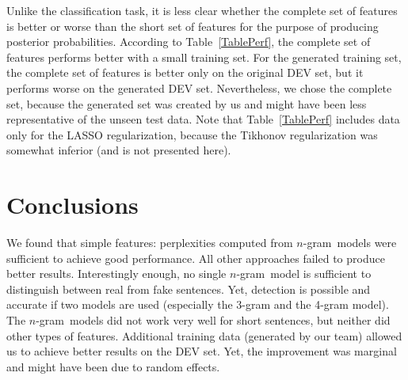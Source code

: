 \documentclass[11pt]{article}
\newcommand{\ngram}{\mbox{$n$-gram }}
\begin{document}
Unlike the classification task, it is less clear whether the complete set of features is better or worse
than the short set of features for the purpose of producing posterior probabilities.
According to Table~\ref{TablePerf}, the complete set of features performs better with a small training set.
For the generated training set, the complete set of features is better only on the original DEV set,
but it performs worse on the generated DEV set.
Nevertheless, we chose the complete set,
because the generated set was created by us and might have been less representative of the unseen test data.
Note that Table~\ref{TablePerf} includes data only for the LASSO
regularization, because the Tikhonov regularization was somewhat inferior (and is not presented here).

\section{Conclusions}
We found that simple features: perplexities computed from \ngram models were sufficient to achieve good performance.
All other approaches failed to produce better results.
Interestingly enough, no single \ngram model is sufficient to distinguish between real from fake sentences.
Yet, detection is possible and accurate if two models are used (especially the 3-gram and the 4-gram model). 
The \ngram models did not work very well for short sentences, but neither did other types of features.
Additional training data (generated by our team) allowed us to achieve better
results on the DEV set. Yet, the improvement was marginal and might have been due to random effects.




\end{document}
